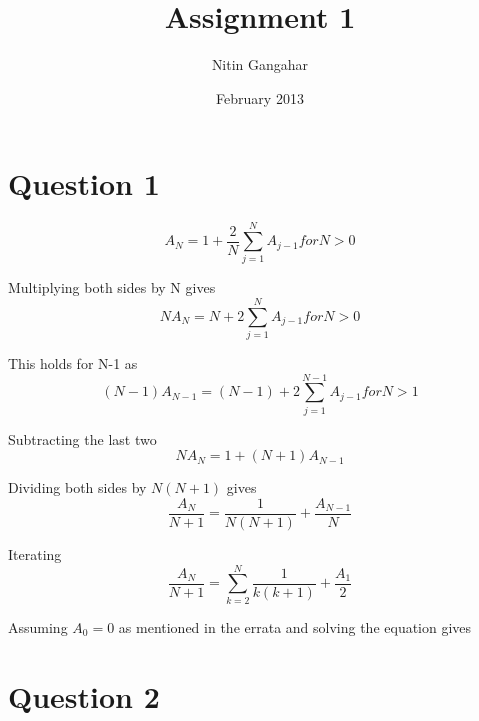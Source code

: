 \documentclass[a4paper,12pt]{article}
\begin{document}
\title{Assignment 1}
\author{Nitin Gangahar}
\date{February 2013}
\maketitle

\section*{Question 1}

\begin{equation}
	A_N = 1 + \frac{2}{N} \sum_{j=1}^{N} A_{j-1}  for N > 0
\end{equation}

Multiplying both sides by N gives
\begin{equation}
	NA_N = N + 2 \sum_{j=1}^{N} A_{j-1} for N > 0
\end{equation}

This holds for N-1 as
\begin{equation}
	(N-1)A_{N-1} = (N-1) + 2\sum_{j=1}^{N-1} A_{j-1} for N > 1 
\end{equation}

Subtracting the last two
\begin{equation}
	NA_N = 1 + (N+1)A_{N-1}
\end{equation}

Dividing both sides by $N(N+1)$ gives
\begin{equation}
	\frac{A_N}{N+1} = \frac{1}{N(N+1)} + \frac{A_{N-1}}{N}
\end{equation}

Iterating
\begin{equation}
	\frac{A_N}{N+1} = \sum_{k=2}^{N}\frac{1}{k(k+1)} + \frac{A_1}{2}
\end{equation}

Assuming $A_0 = 0$ as mentioned in the errata and solving the equation gives

\centerline{}

\newpage
\section*{Question 2}
\end{document}
